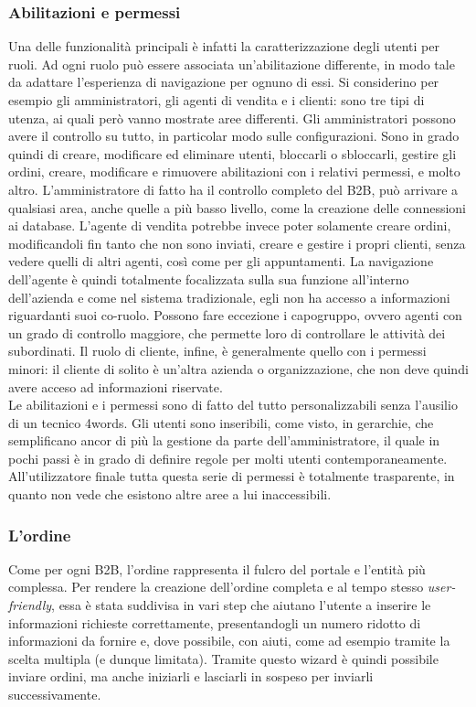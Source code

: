 \subsubsection{Abilitazioni e permessi}
Una delle funzionalità principali è infatti la caratterizzazione degli utenti per ruoli. Ad ogni ruolo può essere associata un'abilitazione differente, in modo tale da adattare l'esperienza di navigazione per ognuno di essi. Si considerino per esempio gli amministratori, gli agenti di vendita e i clienti: sono tre tipi di utenza, ai quali però vanno mostrate aree differenti. Gli amministratori possono avere il controllo su tutto, in particolar modo sulle configurazioni. Sono in grado quindi di creare, modificare ed eliminare utenti, bloccarli o sbloccarli, gestire gli ordini, creare, modificare e rimuovere abilitazioni con i relativi permessi, e molto altro. L'amministratore di fatto ha il controllo completo del B2B, può arrivare a qualsiasi area, anche quelle a più basso livello, come la creazione delle connessioni ai database. L'agente di vendita potrebbe invece poter solamente creare ordini, modificandoli fin tanto che non sono inviati, creare e gestire i propri clienti, senza vedere quelli di altri agenti, così come per gli appuntamenti. La navigazione dell'agente è quindi totalmente focalizzata sulla sua funzione all'interno dell'azienda e come nel sistema tradizionale, egli non ha accesso a informazioni riguardanti suoi co-ruolo. Possono fare eccezione i capogruppo, ovvero agenti con un grado di controllo maggiore, che permette loro di controllare le attività dei subordinati. Il ruolo di cliente, infine, è generalmente quello con i permessi minori: il cliente di solito è un'altra azienda o organizzazione, che non deve quindi avere acceso ad informazioni riservate.\\
Le abilitazioni e i permessi sono di fatto del tutto personalizzabili senza l'ausilio di un tecnico 4words. Gli utenti sono inseribili, come visto, in gerarchie, che semplificano ancor di più la gestione da parte dell'amministratore, il quale in pochi passi è in grado di definire regole per molti utenti contemporaneamente. All'utilizzatore finale tutta questa serie di permessi è totalmente trasparente, in quanto non vede che esistono altre aree a lui inaccessibili.

\subsubsection{L'ordine}
Come per ogni B2B, l'ordine rappresenta il fulcro del portale e l'entità più complessa. Per rendere la creazione dell'ordine completa e al tempo stesso \textit{user-friendly}, essa è stata suddivisa in vari step che aiutano l'utente a inserire le informazioni richieste correttamente, presentandogli un numero ridotto di informazioni da fornire e, dove possibile, con aiuti, come ad esempio tramite la scelta multipla (e dunque limitata). Tramite questo \gls{wizard} è quindi possibile inviare ordini, ma anche iniziarli e lasciarli in sospeso per inviarli successivamente.

